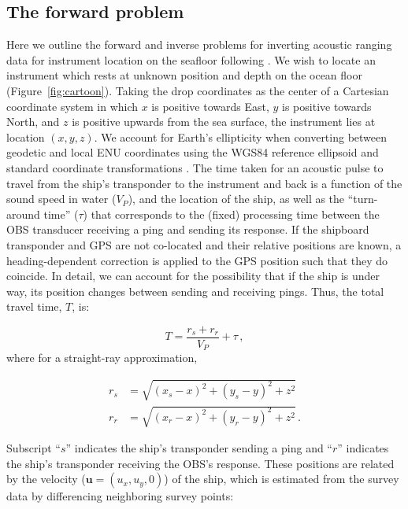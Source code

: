 

\subsection{The forward problem}

Here we outline the forward and inverse problems for inverting acoustic ranging data for instrument location on the seafloor following \citet{Creager1982}. We wish to locate an instrument which rests at unknown position and depth on the ocean floor (Figure~\ref{fig:cartoon}). Taking the drop coordinates as the center of a Cartesian coordinate system in which $x$ is positive towards East, $y$ is positive towards North, and $z$ is positive upwards from the sea surface, the instrument lies at location $(x,y,z)$. We account for Earth's ellipticity when converting between geodetic and local ENU coordinates using the WGS84 reference ellipsoid \citep{WGS84_2000} and standard coordinate transformations \citep[i.e.,][]{Hoffmann_Wellenhof_2001}. The time taken for an acoustic pulse to travel from the ship's transponder to the instrument and back is a function of the sound speed in water ($V_P$), and the location of the ship, as well as the ``turn-around time'' ($\tau$) that corresponds to the (fixed) processing time between the OBS transducer receiving a ping and sending its response. If the shipboard transponder and GPS are not co-located and their relative positions are known, a heading-dependent correction is applied to the GPS position such that they do coincide. In detail, we can account for the possibility that if the ship is under way, its position changes between sending and receiving pings. Thus, the total travel time, $T$, is: 

\begin{equation}
T = \frac{r_s + r_r}{V_P} + \tau \,, \label{eq:forward_send_receive}
\end{equation}
where for a straight-ray approximation,

\begin{align}
	r_s &= \sqrt{(x_s - x)^2 + (y_s - y)^2 + z^2}\\
	r_r &= \sqrt{(x_r - x)^2 + (y_r - y)^2 + z^2} \,.
\end{align}

Subscript ``$s$'' indicates the ship's transponder sending a ping and ``$r$'' indicates the ship's transponder receiving the OBS's response. These positions are related by the velocity ($\mathbf{u} = (u_x,u_y,0)$) of the ship, which is estimated from the survey data by differencing neighboring survey points:


